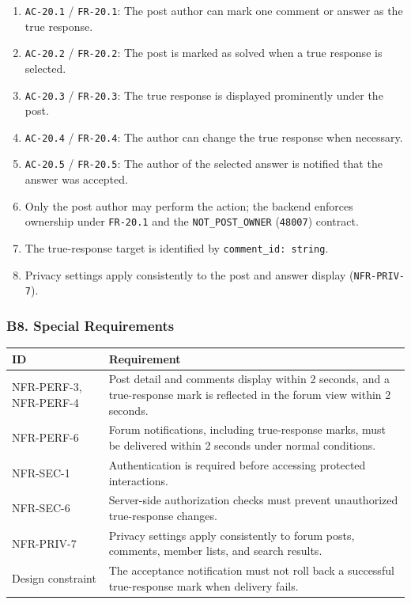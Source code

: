 \documentclass[12pt]{article}
\renewcommand{\baselinestretch}{1.5}
\begin{document}
\begin{enumerate}
\item \texttt{AC-20.1} / \texttt{FR-20.1}: The post author can mark one comment or answer as the true response.
\item \texttt{AC-20.2} / \texttt{FR-20.2}: The post is marked as solved when a true response is selected.
\item \texttt{AC-20.3} / \texttt{FR-20.3}: The true response is displayed prominently under the post.
\item \texttt{AC-20.4} / \texttt{FR-20.4}: The author can change the true response when necessary.
\item \texttt{AC-20.5} / \texttt{FR-20.5}: The author of the selected answer is notified that the answer was accepted.
\item Only the post author may perform the action; the backend enforces ownership under \texttt{FR-20.1} and the \texttt{NOT\_POST\_OWNER} (\texttt{48007}) contract.
\item The true-response target is identified by \texttt{comment\_id: string}.
\item Privacy settings apply consistently to the post and answer display (\texttt{NFR-PRIV-7}).
\end{enumerate}
\par\medskip

\hypertarget{sec:b8-special-requirements}{}
\subsubsection*{B8. Special Requirements}
\par\medskip

\begingroup
\small
\renewcommand{\baselinestretch}{1.0}\selectfont
\renewcommand{\arraystretch}{1.15}
\setlength{\tabcolsep}{6pt}
\begin{longtable}{|>{\raggedright\arraybackslash}p{}|>{\raggedright\arraybackslash}p{}|}
\hline
\textbf{ID} & \textbf{Requirement} \\ \hline
\endhead
NFR-PERF-3, NFR-PERF-4 & Post detail and comments display within 2 seconds, and a true-response mark is reflected in the forum view within 2 seconds. \\ \hline
NFR-PERF-6 & Forum notifications, including true-response marks, must be delivered within 2 seconds under normal conditions. \\ \hline
NFR-SEC-1 & Authentication is required before accessing protected interactions. \\ \hline
NFR-SEC-6 & Server-side authorization checks must prevent unauthorized true-response changes. \\ \hline
NFR-PRIV-7 & Privacy settings apply consistently to forum posts, comments, member lists, and search results. \\ \hline
Design constraint & The acceptance notification must not roll back a successful true-response mark when delivery fails. \\ \hline
\end{longtable}
\endgroup
\par\medskip
\end{document}
